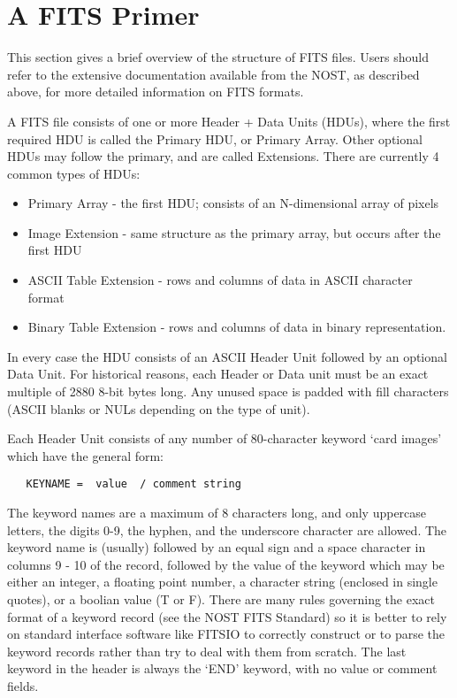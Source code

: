 \section{A FITS Primer}

This section gives a brief overview of the structure of FITS files.
Users should refer to the extensive documentation available from the
NOST, as described above, for more detailed information on FITS formats.

A FITS file consists of one or more Header + Data Units (HDUs), 
where the first required HDU is called the Primary HDU, or Primary
Array.  Other optional HDUs may follow the primary, and are called
Extensions.   There are currently 4 common types of HDUs:
\begin{itemize}
\item
Primary Array - the first HDU; consists of an N-dimensional array of pixels
\item
Image Extension - same structure as the primary array, but occurs after the
first HDU
\item
ASCII Table Extension -  rows and columns of data in ASCII character
format
\item
Binary Table Extension -  rows and columns of data in binary representation.
\end{itemize}
In every case the HDU consists of an ASCII Header Unit followed by an optional
Data Unit.  For historical reasons, each Header or Data unit must be an
exact multiple of 2880 8-bit bytes long.  Any unused space is padded
with fill characters (ASCII blanks or NULs depending on the type of unit).

Each Header Unit consists of any number of 80-character keyword `card images'
which have the general form:

\begin{verbatim}
   KEYNAME =  value  / comment string
\end{verbatim}

The keyword names are a maximum of 8 characters long, and only uppercase
letters, the digits 0-9, the hyphen, and the underscore character are
allowed.  The keyword name is (usually) followed by an equal sign
and a space character in columns 9 - 10 of the record, followed by
the value of the keyword which may be either an integer, a floating
point number, a character string (enclosed in single quotes), or
a boolian value (T or F).  There are many rules governing the exact
format of a keyword record (see the NOST FITS Standard) so it is
better to rely on standard interface software like FITSIO to correctly 
construct or to parse the keyword records rather than try to
deal with them from scratch.  The last keyword in the
header is always the `END' keyword, with no value or comment fields.

